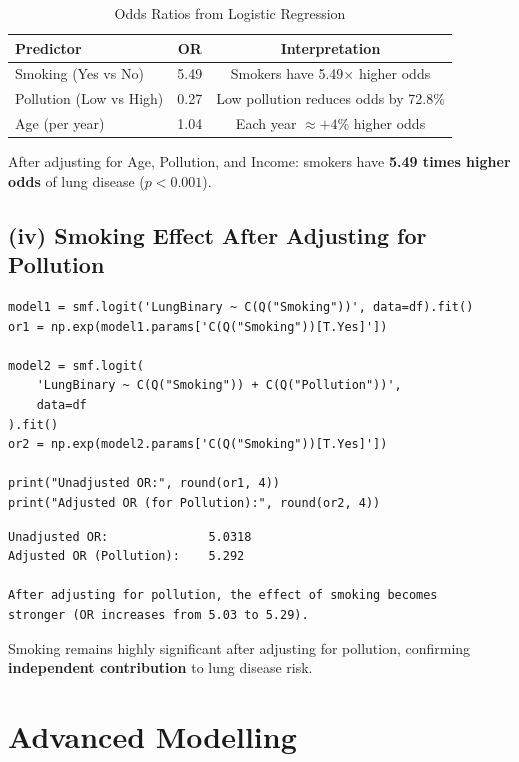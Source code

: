\documentclass[12pt,a4paper]{article}
\begin{document}
\begin{table}[H]
  \centering
  \caption{Odds Ratios from Logistic Regression}
  \begin{tabular}{lcc}
    \toprule
    \textbf{Predictor} & \textbf{OR} & \textbf{Interpretation} \\
    \midrule
    Smoking (Yes vs No)     & 5.49 & Smokers have 5.49$\times$ higher odds \\
    Pollution (Low vs High) & 0.27 & Low pollution reduces odds by 72.8\% \\
    Age (per year)          & 1.04 & Each year $\approx +4$\% higher odds \\
    \bottomrule
  \end{tabular}
\end{table}

After adjusting for Age, Pollution, and Income: smokers have \textbf{5.49 times higher odds} of lung disease ($p < 0.001$).

\subsection{(iv) Smoking Effect After Adjusting for Pollution}

\begin{lstlisting}[style=pythonstyle]
model1 = smf.logit('LungBinary ~ C(Q("Smoking"))', data=df).fit()
or1 = np.exp(model1.params['C(Q("Smoking"))[T.Yes]'])

model2 = smf.logit(
    'LungBinary ~ C(Q("Smoking")) + C(Q("Pollution"))',
    data=df
).fit()
or2 = np.exp(model2.params['C(Q("Smoking"))[T.Yes]'])

print("Unadjusted OR:", round(or1, 4))
print("Adjusted OR (for Pollution):", round(or2, 4))
\end{lstlisting}

\begin{lstlisting}[style=outputstyle]
Unadjusted OR:              5.0318
Adjusted OR (Pollution):    5.292

After adjusting for pollution, the effect of smoking becomes
stronger (OR increases from 5.03 to 5.29).
\end{lstlisting}

Smoking remains highly significant after adjusting for pollution, confirming \textbf{independent contribution} to lung disease risk.

\section{Advanced Modelling}
\end{document}
